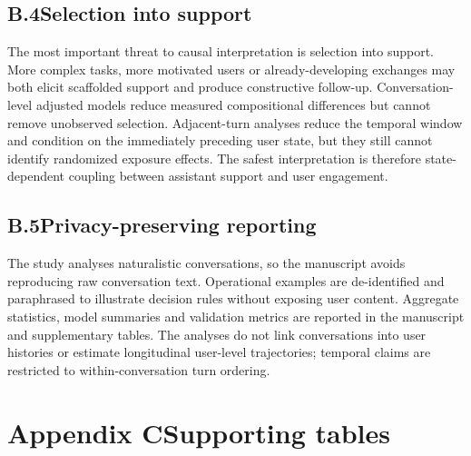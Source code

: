 \subsection*{B.4\quad Selection into support}

The most important threat to causal interpretation is selection into support. More complex tasks, more motivated users or already-developing exchanges may both elicit scaffolded support and produce constructive follow-up. Conversation-level adjusted models reduce measured compositional differences but cannot remove unobserved selection. Adjacent-turn analyses reduce the temporal window and condition on the immediately preceding user state, but they still cannot identify randomized exposure effects. The safest interpretation is therefore state-dependent coupling between assistant support and user engagement.

\subsection*{B.5\quad Privacy-preserving reporting}

The study analyses naturalistic conversations, so the manuscript avoids reproducing raw conversation text. Operational examples are de-identified and paraphrased to illustrate decision rules without exposing user content. Aggregate statistics, model summaries and validation metrics are reported in the manuscript and supplementary tables. The analyses do not link conversations into user histories or estimate longitudinal user-level trajectories; temporal claims are restricted to within-conversation turn ordering.

\section*{Appendix C\quad Supporting tables}
\setcounter{table}{0}
\renewcommand{\thetable}{C\arabic{table}}















